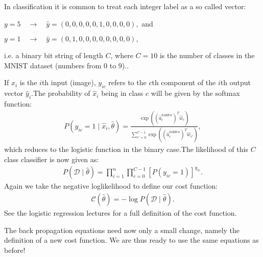 \documentclass[letterpaper,10pt,english]{sphinxmanual}
\begin{document}
In  classification it is common to treat each integer label as a so called  vector:

\(y = 5 \quad \rightarrow \quad \hat{y} = (0, 0, 0, 0, 0, 1, 0, 0, 0, 0) ,\) and

\(y = 1 \quad \rightarrow \quad \hat{y} = (0, 1, 0, 0, 0, 0, 0, 0, 0, 0) ,\)

i.e. a binary bit string of length \(C\), where \(C = 10\) is the number of classes in the MNIST dataset (numbers from \(0\) to \(9\))..

If \(\hat{x}_i\) is the \(i\)\sphinxhyphen{}th input (image), \(y_{ic}\) refers to the \(c\)\sphinxhyphen{}th component of the \(i\)\sphinxhyphen{}th
output vector \(\hat{y}_i\).The probability of \(\hat{x}_i\) being in class \(c\) will be given by the softmax function:
\begin{equation*}
\begin{split}
P(y_{ic} = 1 \mid \hat{x}_i, \hat{\theta}) = \frac{\exp{((\hat{a}_i^{hidden})^T \hat{w}_c)}}
{\sum_{c'=0}^{C-1} \exp{((\hat{a}_i^{hidden})^T \hat{w}_{c'})}} ,
\end{split}
\end{equation*}
which reduces to the logistic function in the binary case.The likelihood of this \(C\)\sphinxhyphen{}class classifier
is now given as:
\begin{equation*}
\begin{split}
P(\mathcal{D} \mid \hat{\theta}) = \prod_{i=1}^n \prod_{c=0}^{C-1} [P(y_{ic} = 1)]^{y_{ic}} .
\end{split}
\end{equation*}
Again we take the negative log\sphinxhyphen{}likelihood to define our cost function:
\begin{equation*}
\begin{split}
\mathcal{C}(\hat{\theta}) = - \log{P(\mathcal{D} \mid \hat{\theta})}.
\end{split}
\end{equation*}
See the logistic regression lectures for a full definition of the cost function.

The back propagation equations need now only a small change, namely the definition of a new cost function. We are thus ready to use the same equations as before!
\end{document}
